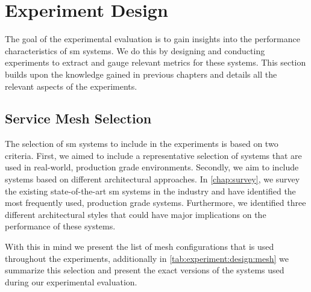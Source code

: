 \section{Experiment Design}
\label{sec:experiments:design}



The goal of the experimental evaluation is to gain insights into the performance characteristics of \gls{sm} systems. We do this by designing and conducting experiments to extract and gauge relevant metrics for these systems. This section builds upon the knowledge gained in previous chapters and details all the relevant aspects of the experiments.



\subsection{Service Mesh Selection}
\label{sec:experiments:design:meshes}

The selection of \gls{sm} systems to include in the experiments is based on two criteria. First, we aimed to include a representative selection of systems that are used in real-world, production grade environments. Secondly, we aim to include systems based on different architectural approaches. In \cref{chap:survey}, we survey the existing state-of-the-art \gls{sm} systems in the industry and have identified the most frequently used, production grade systems. Furthermore, we identified three different architectural styles that could have major implications on the performance of these systems.



With this in mind we present the list of mesh configurations that is used throughout the experiments, additionally in \cref{tab:experiment:design:mesh} we summarize this selection and present the exact versions of the systems used during our experimental evaluation.

